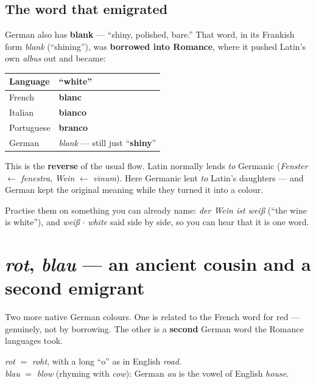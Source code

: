 \subsection*{The word that emigrated}

German also has \textbf{blank} --- ``shiny, polished, bare.'' That word, in its
Frankish form \emph{blank} (``shining''), was \textbf{borrowed into Romance},
where it pushed Latin's own \emph{albus} out and became:

\begin{center}
\begin{tabular}{@{}ll@{}}
\toprule
Language & ``white'' \\
\midrule
French & \textbf{blanc} \\
Italian & \textbf{bianco} \\
Portuguese & \textbf{branco} \\
German & \emph{blank} --- still just ``\textbf{shiny}'' \\
\bottomrule
\end{tabular}
\end{center}

\begin{culture}
This is the \textbf{reverse} of the usual flow. Latin normally lends \emph{to}
Germanic (\emph{Fenster} $\leftarrow$ \emph{fenestra}, \emph{Wein}
$\leftarrow$ \emph{v\=\i num}). Here Germanic lent \emph{to} Latin's daughters
--- and German kept the original meaning while they turned it into a colour.
\end{culture}

Practise them on something you can already name: \emph{der Wein ist wei\ss{}}
(``the wine is white''), and \emph{wei\ss{}} $\cdot$ \emph{white} said side by
side, so you can hear that it is one word.

\section[\emph{rot} and \emph{blau}]{\emph{rot}, \emph{blau} --- an ancient cousin and a second emigrant}
\label{lesson:rot-blau}

Two more native German colours. One is related to the French word for red ---
genuinely, not by borrowing. The other is a \textbf{second} German word the
Romance languages took.

\begin{sounds}
\emph{rot} $=$ \emph{roht}, with a long ``o'' as in English \emph{road}.\\[3pt]
\emph{blau} $=$ \emph{blow} (rhyming with \emph{cow}): German \emph{au} is the
vowel of English \emph{house}.
\end{sounds}


